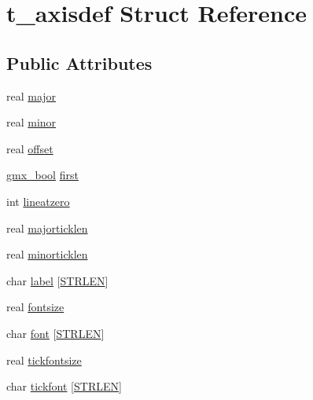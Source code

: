 \hypertarget{structt__axisdef}{\section{t\-\_\-axisdef \-Struct \-Reference}
\label{structt__axisdef}
}
\subsection*{\-Public \-Attributes}
\begin{DoxyCompactItemize}
\item 
real \hyperlink{structt__axisdef_a0bac17d6659f4d2449f54cf26d7ca647}{major}
\item 
real \hyperlink{structt__axisdef_a4b27edd3a16698d6992ff5e4fbc63950}{minor}
\item 
real \hyperlink{structt__axisdef_a79f25e2e3ee86505c65082e80608849e}{offset}
\item 
\hyperlink{include_2types_2simple_8h_a8fddad319f226e856400d190198d5151}{gmx\-\_\-bool} \hyperlink{structt__axisdef_ad162e619a22a92094d3ce942f768c257}{first}
\item 
int \hyperlink{structt__axisdef_a88d865f606b2d3ba315fa58d9a700888}{lineatzero}
\item 
real \hyperlink{structt__axisdef_a5cabf1ce075b6503671339e1afc53621}{majorticklen}
\item 
real \hyperlink{structt__axisdef_a63226d12588389b8333d73974839bbd0}{minorticklen}
\item 
char \hyperlink{structt__axisdef_a3ce95a987b8ed51f0225817361493412}{label} \mbox{[}\hyperlink{share_2template_2gromacs_2types_2simple_8h_a278cf415676752815cfb411cb0b32802}{\-S\-T\-R\-L\-E\-N}\mbox{]}
\item 
real \hyperlink{structt__axisdef_a0be490bcaaba018f1c93169d01c9d61e}{fontsize}
\item 
char \hyperlink{structt__axisdef_ada2bb5475efb0d7459834d5e14345aac}{font} \mbox{[}\hyperlink{share_2template_2gromacs_2types_2simple_8h_a278cf415676752815cfb411cb0b32802}{\-S\-T\-R\-L\-E\-N}\mbox{]}
\item 
real \hyperlink{structt__axisdef_a2c86bdd3051e88296a60d4e9ed84088d}{tickfontsize}
\item 
char \hyperlink{structt__axisdef_abd5d7cef4b8d6d894b2f6f0b4169bc7b}{tickfont} \mbox{[}\hyperlink{share_2template_2gromacs_2types_2simple_8h_a278cf415676752815cfb411cb0b32802}{\-S\-T\-R\-L\-E\-N}\mbox{]}
\end{DoxyCompactItemize}


